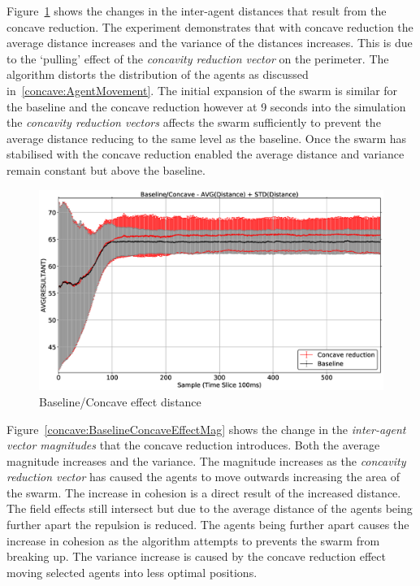 Figure~\ref{concave:BaselineConcaveEffectDist} shows the changes in the inter-agent distances that result from the concave reduction. The experiment demonstrates that with concave reduction the average distance increases and the variance of the distances increases. This is due to the `pulling' effect of the \textit{concavity reduction vector} on the perimeter. The algorithm distorts the distribution of the agents as discussed in~\autoref{concave:AgentMovement}. The initial expansion of the swarm is similar for the baseline and the concave reduction however at 9 seconds into the simulation the \textit{concavity reduction vectors} affects the swarm sufficiently to prevent the average distance reducing to the same level as the baseline. Once the swarm has stabilised with the concave reduction enabled the average distance and variance remain constant but above the baseline.

\begin{figure}[H]
\begin{center}
\includegraphics[width=14cm]{CHAPTER-7/figures/BaselineConcaveEffectDist}
\end{center}
\caption{Baseline/Concave effect distance \label{concave:BaselineConcaveEffectDist}}
\end{figure}

Figure~\ref{concave:BaselineConcaveEffectMag} shows the change in the \textit{inter-agent vector magnitudes} that the concave reduction introduces. Both the average magnitude increases and the variance. The magnitude increases as the \textit{concavity reduction vector} has caused the agents to move outwards increasing the area of the swarm. The increase in cohesion is a direct result of the increased distance. The field effects still intersect but due to the average distance of the agents being further apart the repulsion is reduced. The agents being further apart causes the increase in cohesion as the algorithm attempts to prevents the swarm from breaking up. The variance increase is caused by the concave reduction effect moving selected agents into less optimal positions.

